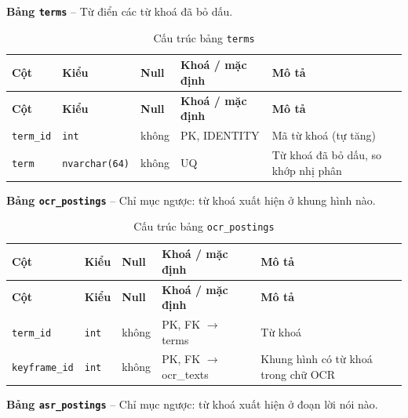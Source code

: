\textbf{Bảng \texttt{terms}} -- Từ điển các từ khoá đã bỏ dấu.

\setlength{\tabcolsep}{4pt}
\begin{longtable}{>{\raggedright\arraybackslash}p{}>{\raggedright\arraybackslash}p{}>{\centering\arraybackslash}p{}>{\raggedright\arraybackslash}p{}>{\raggedright\arraybackslash}p{}}
\caption{Cấu trúc bảng \texttt{terms}}\label{tab:col_terms}\\
\toprule \textbf{Cột} & \textbf{Kiểu} & \textbf{Null} & \textbf{Khoá / mặc định} & \textbf{Mô tả} \\ \midrule \endfirsthead
\toprule \textbf{Cột} & \textbf{Kiểu} & \textbf{Null} & \textbf{Khoá / mặc định} & \textbf{Mô tả} \\ \midrule \endhead
\bottomrule \endfoot
\texttt{term\_id} & {\footnotesize\texttt{int}} & không & PK, IDENTITY & Mã từ khoá (tự tăng) \\
\texttt{term} & {\footnotesize\texttt{nvarchar(64)}} & không & UQ & Từ khoá đã bỏ dấu, so khớp nhị phân \\
\end{longtable}

\textbf{Bảng \texttt{ocr\_postings}} -- Chỉ mục ngược: từ khoá xuất hiện ở khung hình nào.

\setlength{\tabcolsep}{4pt}
\begin{longtable}{>{\raggedright\arraybackslash}p{}>{\raggedright\arraybackslash}p{}>{\centering\arraybackslash}p{}>{\raggedright\arraybackslash}p{}>{\raggedright\arraybackslash}p{}}
\caption{Cấu trúc bảng \texttt{ocr\_postings}}\label{tab:col_ocr_postings}\\
\toprule \textbf{Cột} & \textbf{Kiểu} & \textbf{Null} & \textbf{Khoá / mặc định} & \textbf{Mô tả} \\ \midrule \endfirsthead
\toprule \textbf{Cột} & \textbf{Kiểu} & \textbf{Null} & \textbf{Khoá / mặc định} & \textbf{Mô tả} \\ \midrule \endhead
\bottomrule \endfoot
\texttt{term\_id} & {\footnotesize\texttt{int}} & không & PK, FK $\rightarrow$ terms & Từ khoá \\
\texttt{keyframe\_id} & {\footnotesize\texttt{int}} & không & PK, FK $\rightarrow$ ocr\_texts & Khung hình có từ khoá trong chữ OCR \\
\end{longtable}

\textbf{Bảng \texttt{asr\_postings}} -- Chỉ mục ngược: từ khoá xuất hiện ở đoạn lời nói nào.

